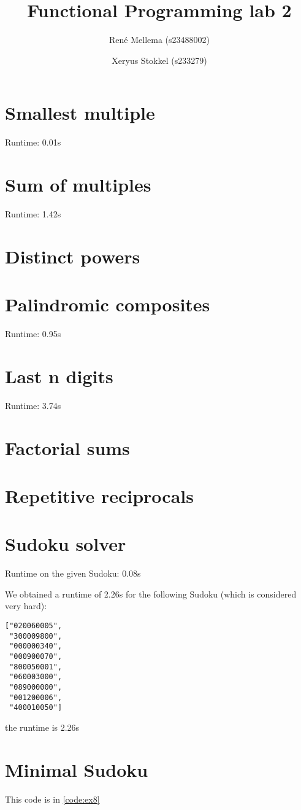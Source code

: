 \documentclass[a4paper]{article}
\title{Functional Programming lab 2}
\author{Ren\'e Mellema (s23488002) \and Xeryus Stokkel (s233279)}
\begin{document}
\maketitle

\section{Smallest multiple}

Runtime: 0.01s

\section{Sum of multiples}

Runtime: 1.42s

\section{Distinct powers}


\section{Palindromic composites}

Runtime: 0.95s

\section{Last n digits}

Runtime: 3.74s

\section{Factorial sums}


\section{Repetitive reciprocals}


\section{Sudoku solver}

Runtime on the given Sudoku: 0.08s

We obtained a runtime of 2.26s for the following Sudoku (which is considered very hard):
\begin{lstlisting}
["020060005",
 "300009800",
 "000000340",
 "000900070",
 "800050001",
 "060003000",
 "089000000",
 "001200006",
 "400010050"]
\end{lstlisting}
the runtime is 2.26s

\section{Minimal Sudoku}
This code is in \autoref{code:ex8}
\end{document}
